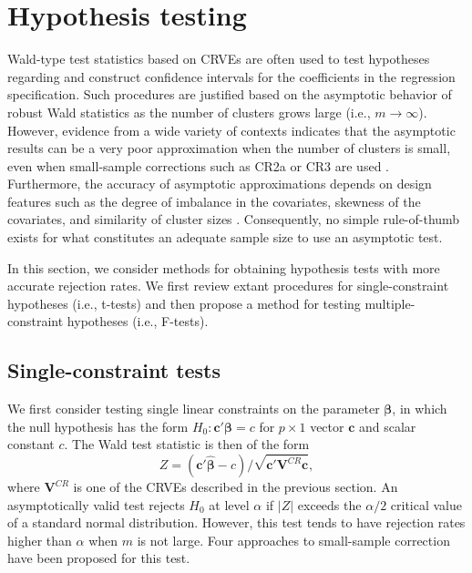 \documentclass[12pt]{article}\usepackage[]{graphicx}\usepackage[]{color}
\newcommand{\bm}{\mathbf}
\newcommand{\bs}{\boldsymbol}
\begin{document}
\section{Hypothesis testing}
\label{sec:testing}

Wald-type test statistics based on CRVEs are often used to test hypotheses regarding and construct confidence intervals for the coefficients in the regression specification. 
Such procedures are justified based on the asymptotic behavior of robust Wald statistics as the number of clusters grows large (i.e., $m \to \infty$). 
However, evidence from a wide variety of contexts indicates that the asymptotic results can be a very poor approximation when the number of clusters is small, even when small-sample corrections such as CR2a or CR3 are used \citep{Bell2002bias, Bertrand2004how, Cameron2008bootstrap}. 
Furthermore, the accuracy of asymptotic approximations depends on design features such as the degree of imbalance in the covariates, skewness of the covariates, and similarity of cluster sizes \citep{McCaffrey2001generalizations, Tipton2015small, Webb2013wild}. 
Consequently, no simple rule-of-thumb exists for what constitutes an adequate sample size to use an asymptotic test. 

In this section, we consider methods for obtaining hypothesis tests with more accurate rejection rates. 
We first review extant procedures for single-constraint hypotheses (i.e., t-tests) and then propose a method for testing multiple-constraint hypotheses (i.e., F-tests). 

\subsection{Single-constraint tests}

We first consider testing single linear constraints on the parameter $\bs\beta$, in which the null hypothesis has the form $H_0: \bm{c}'\bs\beta = c$ for $p \times 1$ vector $\bm{c}$ and scalar constant $c$. 
The Wald test statistic is then of the form 
\begin{equation}
\label{eq:Wald_z}
Z = \left(\bm{c}'\bs{\hat\beta} - c\right) / \sqrt{\bm{c}'\bm{V}^{CR}\bm{c}},
\end{equation}
where $\bm{V}^{CR}$ is one of the CRVEs described in the previous section. 
An asymptotically valid test rejects $H_0$ at level $\alpha$ if $|Z|$ exceeds the $\alpha / 2$ critical value of a standard normal distribution. 
However, this test tends to have rejection rates higher than $\alpha$ when $m$ is not large. 
Four approaches to small-sample correction have been proposed for this test. 
\end{document}
